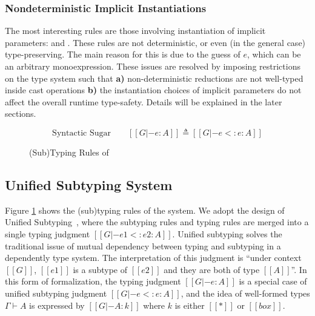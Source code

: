 \subsubsection{Nondeterministic Implicit Instantiations}
The most interesting rules are those involving instantiation of implicit parameters:
 and . These rules are not deterministic, or even
(in the general case) type-preserving. The main reason for this is due to the
guess of $e$, which can be an arbitrary monoexpression.
These issues are resolved by imposing restrictions on the type system such that
\textbf{a)} non-deterministic reductions are not well-typed inside cast operations
\textbf{b)} the instantiation choices of implicit parameters do not affect the
overall runtime type-safety. Details will be explained in the later sections.

\begin{figure}
    \centering

    \begin{equation*}
       \text{Syntactic Sugar} \qquad [[G |- e : A]] \triangleq [[G |- e <: e : A]]
    \end{equation*}
    \caption{(Sub)Typing Rules of \system}
    \label{fig:typing}
\end{figure}

\subsection{Unified Subtyping System}

Figure \ref{fig:typing} shows the (sub)typing rules of the system. We adopt the design
of Unified Subtyping~\cite{yang2017unifying}, where the subtyping rules and
typing rules are merged into a single typing judgment $[[G |- e1 <: e2 : A]]$. 
Unified subtyping solves the traditional issue of mutual dependency between typing
and subtyping in a dependently type system.
The interpretation of this judgment is ``under context $[[G]]$, $[[e1]]$ is a
subtype of $[[e2]]$ and they are both of type $[[A]]$''.
In this form of formalization, the typing judgment $[[G |- e : A]]$ is a
special case of unified subtyping judgment $[[G |- e <: e : A]]$,
and the idea of well-formed types $\Gamma \vdash A$ is expressed by
$[[G |- A : k]]$ where $k$ is either $[[*]]$ or $[[box]]$.

